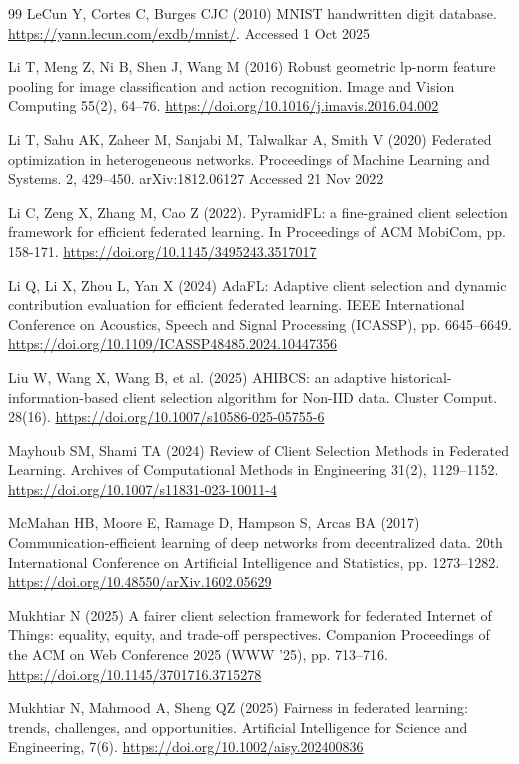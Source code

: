 \documentclass[pdflatex,sn-mathphys-num,oneside]{sn-jnl}%
\theoremstyle{thmstyleone}%
\theoremstyle{thmstyletwo}%
\theoremstyle{thmstylethree}%
\begin{document}
\begin{thebibliography}{99}
LeCun Y, Cortes C, Burges CJC (2010) MNIST handwritten digit database. \url{https://yann.lecun.com/exdb/mnist/}. Accessed 1 Oct 2025

Li T, Meng Z, Ni B, Shen J, Wang M (2016) Robust geometric lp-norm feature pooling for image classification and action recognition. Image and Vision Computing 55(2), 64–76. \url{https://doi.org/10.1016/j.imavis.2016.04.002}

Li T, Sahu AK, Zaheer M, Sanjabi M, Talwalkar A, Smith V (2020) Federated optimization in heterogeneous networks. Proceedings of Machine Learning and Systems. 2, 429–450. arXiv:1812.06127 Accessed 21 Nov 2022

Li C, Zeng X, Zhang M, Cao Z (2022). PyramidFL: a fine-grained client selection framework for efficient federated learning. In Proceedings of ACM MobiCom, pp. 158-171. \url{https://doi.org/10.1145/3495243.3517017}

Li Q, Li X, Zhou L, Yan X (2024) AdaFL: Adaptive client selection and dynamic contribution evaluation for efficient federated learning. IEEE International Conference on Acoustics, Speech and Signal Processing (ICASSP), pp. 6645–6649. \url{https://doi.org/10.1109/ICASSP48485.2024.10447356}

Liu W, Wang X, Wang B, et al. (2025) AHIBCS: an adaptive historical-information-based client selection algorithm for Non-IID data. Cluster Comput. 28(16). \url{https://doi.org/10.1007/s10586-025-05755-6}

Mayhoub SM, Shami TA (2024) Review of Client Selection Methods in Federated Learning. Archives of Computational Methods in Engineering 31(2), 1129–1152. \url{https://doi.org/10.1007/s11831-023-10011-4}

McMahan HB, Moore E, Ramage D, Hampson S, Arcas BA (2017) Communication-efficient learning of deep networks from decentralized data. 20th International Conference on Artificial Intelligence and Statistics, pp. 1273–1282. \url{https://doi.org/10.48550/arXiv.1602.05629}

Mukhtiar N (2025) A fairer client selection framework for federated Internet of Things: equality, equity, and trade-off perspectives. Companion Proceedings of the ACM on Web Conference 2025 (WWW ’25), pp. 713–716. \url{https://doi.org/10.1145/3701716.3715278}

Mukhtiar N, Mahmood A, Sheng QZ (2025) Fairness in federated learning: trends, challenges, and opportunities. Artificial Intelligence for Science and Engineering, 7(6). \url{https://doi.org/10.1002/aisy.202400836}


\end{thebibliography}
\end{document}
